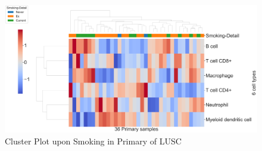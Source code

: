 \documentclass{beamer}
\begin{document}
\begin{frame}[allowframebreaks]
        \begin{figure}
            \includegraphics[width=0.9 \linewidth]{figures/TIMER/Clustermap/STAR.FPKM.SQC.Smoking/TIMER-Primary.pdf}
            \caption{Cluster Plot upon Smoking in Primary of LUSC}
        \end{figure}
    \end{frame}
\end{document}
